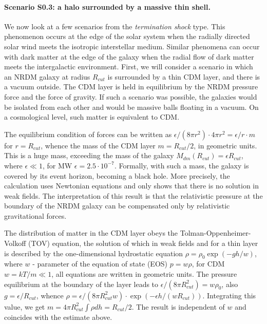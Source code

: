 \documentclass{article}
\begin{document}
\paragraph {Scenario S0.3: a halo surrounded by a massive thin shell.} We now look at a few scenarios from the {\it termination shock} type. This phenomenon occurs at the edge of the solar system when the radially directed solar wind meets the isotropic interstellar medium. Similar phenomena can occur with dark matter at the edge of the galaxy when the radial flow of dark matter meets the intergalactic environment. First, we will consider a scenario in which an NRDM galaxy at radius $ R_ {cut} $ is surrounded by a thin CDM layer, and there is a vacuum outside. The CDM layer is held in equilibrium by the NRDM pressure force and the force of gravity. If such a scenario was possible, the galaxies would be isolated from each other and would be massive balls floating in a vacuum. On a cosmological level, such matter is equivalent to CDM.

The equilibrium condition of forces can be written as $ \epsilon / (8 \pi r ^ 2) \cdot 4 \pi r ^ 2 = \epsilon / r \cdot m $ for $ r = R_ {cut} $, whence the mass of the CDM layer $ m = R_ {cut} / 2 $, in geometric units. This is a huge mass, exceeding the mass of the galaxy $ M_ {dm} (R_ {cut}) = \epsilon R_ {cut} $, where $ \epsilon \ll1 $, for MW $ \epsilon = 2.5 \cdot10 ^ {- 7} $. Formally, with such a mass, the galaxy is covered by its event horizon, becoming a black hole. More precisely, the calculation uses Newtonian equations and only shows that there is no solution in weak fields. The interpretation of this result is that the relativistic pressure at the boundary of the NRDM galaxy can be compensated only by relativistic gravitational forces.

The distribution of matter in the CDM layer obeys the Tolman-Oppenheimer-Volkoff (TOV) equation, the solution of which in weak fields and for a thin layer is described by the one-dimensional hydrostatic equation $ \rho = \rho_0 \exp (-gh / w) $, where $ w $ - parameter of the equation of state (EOS) $ p = w \rho $, for CDM $ w = kT / m \ll1 $, all equations are written in geometric units. The pressure equilibrium at the boundary of the layer leads to $ \epsilon / (8 \pi R_ {cut} ^ 2) = w \rho_0 $, also $ g = \epsilon / R_ {cut} $, whence $ \rho = \epsilon / ( 8 \pi R_ {cut} ^ 2 w) \cdot \exp (- \epsilon h / (wR_ {cut})) $. Integrating this value, we get $ m = 4 \pi R_ {cut} ^ 2 \int \rho dh = R_ {cut} / 2 $. The result is independent of $ w $ and coincides with the estimate above. 
\end{document}
